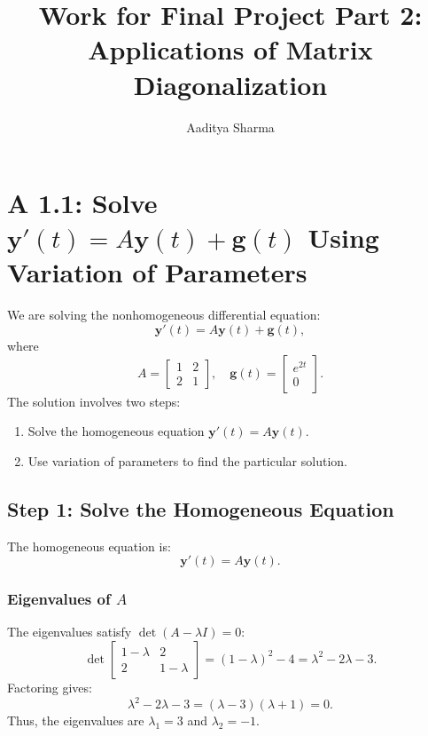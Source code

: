 \documentclass[12pt]{article}
\begin{document}
\title{Work for Final Project Part 2: Applications of Matrix Diagonalization}
\author{Aaditya Sharma}
\date{}
\maketitle

\section*{A 1.1: Solve \( \mathbf{y}'(t) = A\mathbf{y}(t) + \mathbf{g}(t) \) Using Variation of Parameters}

We are solving the nonhomogeneous differential equation:
\[
\mathbf{y}'(t) = A\mathbf{y}(t) + \mathbf{g}(t),
\]
where
\[
A = \begin{bmatrix} 1 & 2 \\ 2 & 1 \end{bmatrix}, \quad \mathbf{g}(t) = \begin{bmatrix} e^{2t} \\ 0 \end{bmatrix}.
\]
The solution involves two steps:
\begin{enumerate}
    \item Solve the homogeneous equation \( \mathbf{y}'(t) = A\mathbf{y}(t) \).
    \item Use variation of parameters to find the particular solution.
\end{enumerate}

\subsection*{Step 1: Solve the Homogeneous Equation}
The homogeneous equation is:
\[
\mathbf{y}'(t) = A\mathbf{y}(t).
\]

\subsubsection*{Eigenvalues of \(A\)}
The eigenvalues satisfy \( \det(A - \lambda I) = 0 \):
\[
\det\begin{bmatrix} 1-\lambda & 2 \\ 2 & 1-\lambda \end{bmatrix} = (1-\lambda)^2 - 4 = \lambda^2 - 2\lambda - 3.
\]
Factoring gives:
\[
\lambda^2 - 2\lambda - 3 = (\lambda - 3)(\lambda + 1) = 0.
\]
Thus, the eigenvalues are \( \lambda_1 = 3 \) and \( \lambda_2 = -1 \).
\end{document}
